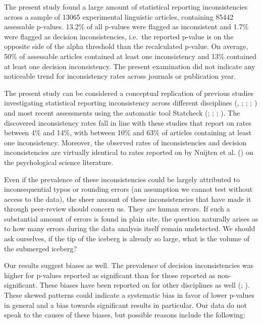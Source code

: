 \documentclass[
  doc,
  longtable,
  nolmodern,
  notxfonts,
  notimes,
  colorlinks=true,linkcolor=blue,citecolor=blue,urlcolor=blue]{apa7}
\begin{document}
The present study found a large amount of statistical reporting
inconsistencies across a sample of 13065 experimental linguistic
articles, containing 85442 assessable p-values. 13.2\% of all p-values
were flagged as inconsistent and 1.7\% were flagged as decision
inconsistencies, i.e.~the reported p-value is on the opposite side of
the alpha threshold than the recalculated p-value. On average, 50\% of
assessable articles contained at least one inconsistency and 13\%
contained at least one decision inconsistency. The present examination
did not indicate any noticeable trend for inconsistency rates across
journals or publication year.

The present study can be considered a conceptual replication of previous
studies investigating statistical reporting inconsistency across
different disciplines (, ;
;
;
) and most
recent assessments using the automatic tool Statcheck
(;
;
;
). The
discovered inconsistency rates fall in line with these studies that
report on rates between 4\% and 14\%, with between 10\% and 63\% of
articles containing at least one inconsistency. Moreover, the observed
rates of inconsistencies and decision inconsistencies are virtually
identical to rates reported on by Nuijten et al.
() on the psychological
science literature.

Even if the prevalence of these inconsistencies could be largely
attributed to inconsequential typos or rounding errors (an assumption we
cannot test without access to the data), the sheer amount of these
inconsistencies that have made it through peer-review should concern us.
They are human errors. If such a substantial amount of errors is found
in plain site, the question naturally arises as to how many errors
during the data analysis itself remain undetected. We should ask
ourselves, if the tip of the iceberg is already so large, what is the
volume of the submerged iceberg?

Our results suggest biases as well. The prevalence of decision
inconsistencies was higher for p-values reported as significant than for
those reported as non-significant. These biases have been reported on
for other disciplines as well (; ). These skewed patterns could indicate a systematic bias in favor
of lower p-values in general and a bias towards significant results in
particular. Our data do not speak to the causes of these biases, but
possible reasons include the following:
\end{document}
